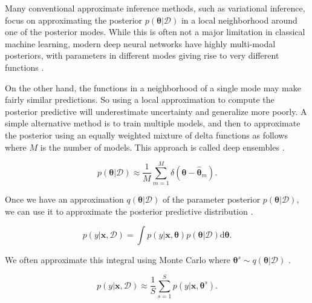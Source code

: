 \documentclass[../../../main.tex]{subfiles}
\begin{document}
Many conventional approximate inference methods, such as variational inference, focus on approximating the posterior $p(\bm{\theta}|\mathcal{D})$ in a local neighborhood around one of the posterior modes. While this is often not a major limitation in classical machine learning, modern deep neural networks have highly multi-modal posteriors, with parameters in different modes giving rise to very different functions \autocite{Murphy2023}.

On the other hand, the functions in a neighborhood of a single mode may make fairly similar predictions. So using a local approximation to compute the posterior predictive will underestimate uncertainty and generalize more poorly. A simple alternative method is to train multiple models, and then to approximate the posterior using an equally weighted mixture of delta functions as follows where $M$ is the number of models. This approach is called deep ensembles \autocite{Murphy2023}.

\begin{equation}
p(\bm{\theta}|\mathcal{D}) \approx \frac{1}{M}\sum_{m=1}^{M} \delta(\bm{\theta}-\hat{\bm{\theta}}_m).
\end{equation}

Once we have an approximation $q(\bm{\theta}|\mathcal{D})$ of the parameter posterior $p(\bm{\theta}|\mathcal{D})$, we can use it to approximate the posterior predictive distribution \autocite{Murphy2023}.

\begin{equation}
p(y|\bm{x},\mathcal{D})=\int p(y|\bm{x},\bm{\theta})p(\bm{\theta}|\mathcal{D})\mathrm{d}\bm{\theta}.
\end{equation}

We often approximate this integral using Monte Carlo where $\bm{\theta}^s \sim q(\bm{\theta}|\mathcal{D})$ \autocite{Murphy2023}.

\begin{equation}
p(y|\bm{x},\mathcal{D}) \approx \frac{1}{S}\sum_{s=1}^{S}p(y|\bm{x},\bm{\theta}^s).
\end{equation}
\end{document}
